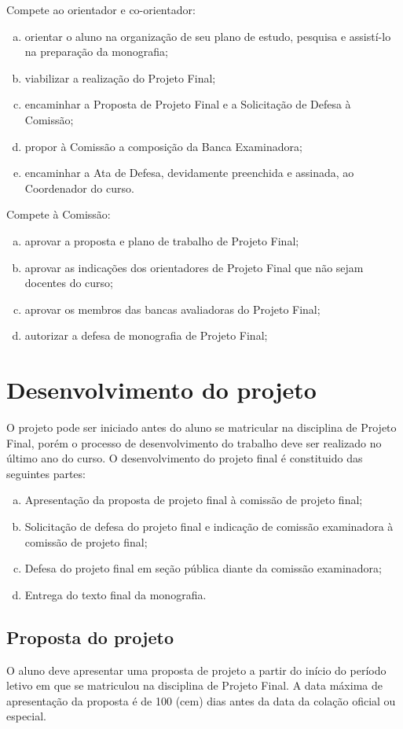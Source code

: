Compete ao orientador e co-orientador:
\begin{enumerate}[a.]
\item orientar o aluno na organização de seu plano de estudo, pesquisa e assistí-lo na preparação da monografia;
\item viabilizar a realização do Projeto Final;
\item encaminhar a Proposta de Projeto Final e a Solicitação de Defesa à Comissão;
\item propor à Comissão a composição da Banca Examinadora;
\item encaminhar a Ata de Defesa, devidamente preenchida e assinada, ao Coordenador do curso.
\end{enumerate}

Compete à Comissão:
\begin{enumerate}[a.]
\item aprovar a proposta e plano de trabalho de Projeto Final;
\item aprovar as indicações dos orientadores de Projeto Final que não sejam docentes do curso;
\item aprovar os membros das bancas avaliadoras do Projeto Final;
\item autorizar a defesa de monografia de Projeto Final;
\end{enumerate}

\section{Desenvolvimento do projeto}

O projeto pode ser iniciado antes do aluno se matricular na disciplina de Projeto Final, porém o 
processo de desenvolvimento do trabalho deve ser realizado no último ano do curso. O desenvolvimento
do projeto final é constituido das seguintes partes:

\begin{enumerate}[a.]
\item Apresentação da proposta de projeto final à comissão de projeto final;
\item Solicitação de defesa do projeto final e indicação de comissão examinadora à comissão de projeto final;
\item Defesa do projeto final em seção pública diante da comissão examinadora;
\item Entrega do texto final da monografia.
\end{enumerate}


\subsection{Proposta do projeto} 
O aluno deve apresentar uma proposta de projeto a partir do início do período
letivo em que se matriculou na disciplina de Projeto Final. A data máxima de apresentação da
proposta é de 100 (cem) dias antes da data da colação oficial ou especial.

